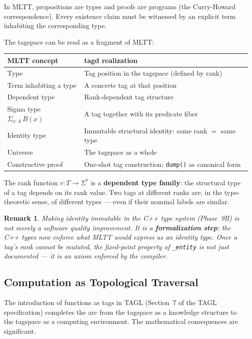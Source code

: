 \documentclass{article}
\newtheorem{remark}{Remark}[section]
\begin{document}
In MLTT, propositions are types and proofs are programs (the Curry-Howard
correspondence). Every existence claim must be witnessed by an explicit term
inhabiting the corresponding type.

The tagspace can be read as a fragment of MLTT:

\begin{center}
\begin{tabular}{ll}
\toprule
\textbf{MLTT concept} & \textbf{tagd realization} \\
\midrule
Type & Tag position in the tagspace (defined by rank) \\
Term inhabiting a type & A concrete tag at that position \\
Dependent type & Rank-dependent tag structure \\
Sigma type $\Sigma_{x:A}\, B(x)$ & A tag together with its predicate fiber \\
Identity type & Immutable structural identity: same rank $=$ same type \\
Universe & The tagspace as a whole \\
Constructive proof & One-shot tag construction; \texttt{dump()} as canonical form \\
\bottomrule
\end{tabular}
\end{center}

\bigskip

The rank function $r : T \to \Sigma^*$ is a \textbf{dependent type family}:
the structural type of a tag depends on its rank value. Two tags at different
ranks are, in the type-theoretic sense, of different types --- even if their
nominal labels are similar.

\begin{remark}
Making identity immutable in the C++ type system (Phase~9B) is not merely a
software quality improvement. It is a \textbf{formalization step}: the C++
types now enforce what MLTT would express as an identity type. Once a tag's
rank cannot be mutated, the fixed-point property of \texttt{\_entity} is not
just documented --- it is an axiom enforced by the compiler.
\end{remark}

\subsection{Computation as Topological Traversal}

The introduction of functions as tags in TAGL (Section~7 of the TAGL
specification) completes the arc from the tagspace as a knowledge structure
to the tagspace as a computing environment. The mathematical consequences
are significant.
\end{document}
